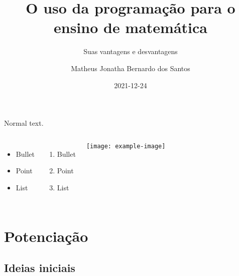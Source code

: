 \documentclass[aspectratio=169,11pt]{uu-beamer}
\title[Matheus Jonatha]{O uso da programação para o ensino de matemática}
\subtitle{Suas vantagens e desvantagens}
\author[\today]{Matheus Jonatha Bernardo dos Santos}
\date{2021-12-24}
\institute[IFRN]{Instituto Federal do RN}
\begin{document}
\logopage

\titlepage

\begin{frame}
    \tableofcontents
\end{frame}



\begin{frame}
    Normal text.

    \begin{columns}
        \begin{itemize}
        \item Bullet
        \item Point
        \item List
        \end{itemize}
        \begin{enumerate}
        \item Bullet
        \item Point
        \item List
        \end{enumerate}
        

        \texttt{[image: example-image]}
      \end{columns}
    
\end{frame}



\section{Potenciação}
    \subsection{Ideias iniciais}
    
\end{document}
